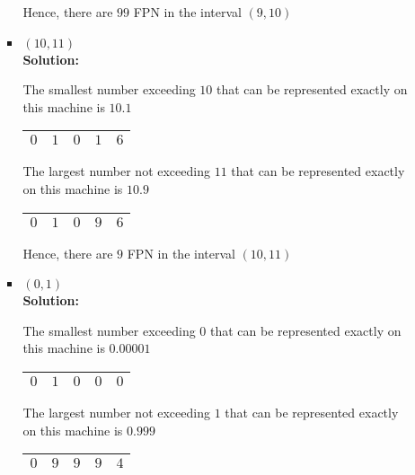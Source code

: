 \documentclass{article}
\begin{document}
\begin{enumerate}
\begin{enumerate}
\begin{itemize}
Hence, there are $99$ FPN in the interval $(9, 10)$\\

\item $(10, 11)$ \\

\textbf{Solution:}

The smallest number exceeding $10$ that can be represented exactly on this machine is
$10.1$

\begin{center}
\renewcommand{\arraystretch}{1.7}
\begin{tabular}{|c|c|c|c|c|}
\hline
$0$ & $1$ & $0$ & $1$ & $6$ \\
\hline
\end{tabular}
\end{center}

The largest number not exceeding $11$ that can be represented exactly on this machine is
$10.9$

\begin{center}
\renewcommand{\arraystretch}{1.7}
\begin{tabular}{|c|c|c|c|c|}
\hline
$0$ & $1$ & $0$ & $9$ & $6$ \\
\hline
\end{tabular}
\end{center} 

Hence, there are $9$ FPN in the interval $(10, 11)$ \\

\item $(0, 1)$ \\

\textbf{Solution:}

The smallest number exceeding $0$ that can be represented exactly on this machine is
$0.00001$ 

\begin{center}
\renewcommand{\arraystretch}{1.7}
\begin{tabular}{|c|c|c|c|c|}
\hline
$0$ & $1$ & $0$ & $0$ & $0$ \\
\hline
\end{tabular}
\end{center} 

The largest number not exceeding $1$ that can be represented exactly on this machine is
$0.999$

\begin{center}
\renewcommand{\arraystretch}{1.7}
\begin{tabular}{|c|c|c|c|c|}
\hline
$0$ & $9$ & $9$ & $9$ & $4$ \\
\hline
\end{tabular}
\end{center} 


\end{itemize}
\end{enumerate}
\end{enumerate}
\end{document}

